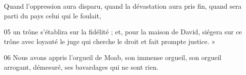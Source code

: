 Quand l’oppression aura disparu, quand la dévastation aura pris fin, quand sera parti du pays celui qui le foulait,

05 un trône s’établira sur la fidélité ; et, pour la maison de David, siégera sur ce trône avec loyauté le juge qui cherche le droit et fait prompte justice. »

06 Nous avons appris l’orgueil de Moab, son immense orgueil, son orgueil arrogant, démesuré, ses bavardages qui ne sont rien.
